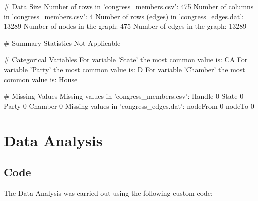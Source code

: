 \documentclass[11pt]{article}
\begin{document}
\begin{codeoutput}
# Data Size
Number of rows in 'congress_members.csv': 475
Number of columns in 'congress_members.csv': 4
Number of rows (edges) in 'congress_edges.dat': 13289
Number of nodes in the graph: 475
Number of edges in the graph: 13289

# Summary Statistics
Not Applicable

# Categorical Variables
For variable 'State' the most common value is: CA
For variable 'Party' the most common value is: D
For variable 'Chamber' the most common value is: House

# Missing Values
Missing values in 'congress_members.csv':
Handle     0
State      0
Party      0
Chamber    0
Missing values in 'congress_edges.dat':
nodeFrom    0
nodeTo      0

\end{codeoutput}

\section{Data Analysis}
\subsection{{Code}}
The Data Analysis was carried out using the following custom code:
\end{document}
